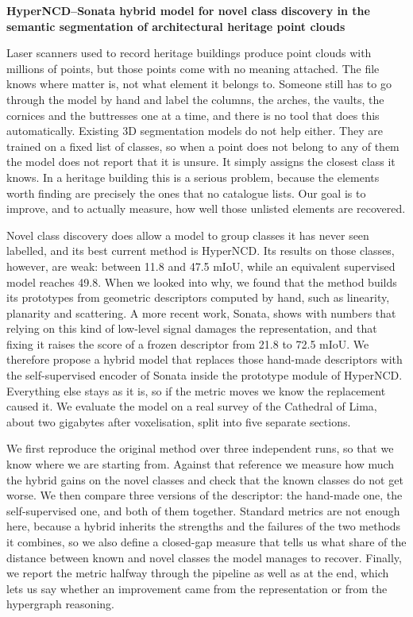 
\begin{center}
\large \vspace{-1.5cm} \textbf{HyperNCD--Sonata hybrid model for novel class
discovery in the semantic segmentation of architectural heritage point clouds}
\end{center}

Laser scanners used to record heritage buildings produce point clouds with
millions of points, but those points come with no meaning attached. The file
knows where matter is, not what element it belongs to. Someone still has to go
through the model by hand and label the columns, the arches, the vaults, the
cornices and the buttresses one at a time, and there is no tool that does this
automatically. Existing 3D segmentation models do not help either. They are
trained on a fixed list of classes, so when a point does not belong to any of
them the model does not report that it is unsure. It simply assigns the closest
class it knows. In a heritage building this is a serious problem, because the
elements worth finding are precisely the ones that no catalogue lists. Our goal
is to improve, and to actually measure, how well those unlisted elements are
recovered.

Novel class discovery does allow a model to group classes it has never seen
labelled, and its best current method is HyperNCD. Its results on those classes,
however, are weak: between 11.8 and 47.5 mIoU, while an equivalent supervised
model reaches 49.8. When we looked into why, we found that the method builds its
prototypes from geometric descriptors computed by hand, such as linearity,
planarity and scattering. A more recent work, Sonata, shows with numbers that
relying on this kind of low-level signal damages the representation, and that
fixing it raises the score of a frozen descriptor from 21.8 to 72.5 mIoU. We
therefore propose a hybrid model that replaces those hand-made descriptors with
the self-supervised encoder of Sonata inside the prototype module of HyperNCD.
Everything else stays as it is, so if the metric moves we know the replacement
caused it. We evaluate the model on a real survey of the Cathedral of Lima, about
two gigabytes after voxelisation, split into five separate sections.

We first reproduce the original method over three independent runs, so that we
know where we are starting from. Against that reference we measure how much the
hybrid gains on the novel classes and check that the known classes do not get
worse. We then compare three versions of the descriptor: the hand-made one, the
self-supervised one, and both of them together. Standard metrics are not enough
here, because a hybrid inherits the strengths and the failures of the two methods
it combines, so we also define a closed-gap measure that tells us what share of
the distance between known and novel classes the model manages to recover.
Finally, we report the metric halfway through the pipeline as well as at the end,
which lets us say whether an improvement came from the representation or from the
hypergraph reasoning.

